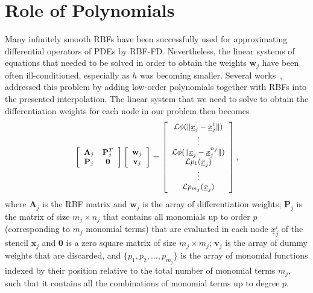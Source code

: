 \documentclass{UUThesisTemplate}
\begin{document}
\section{Role of Polynomials}
Many infinitely smooth RBFs have been successfully used for approximating differential operators of PDEs by RBF-FD. Nevertheless, the linear systems of equations that needed to be solved in order to obtain the weights $\mathbf{w}_j$ have been often ill-conditioned, especially as $h$ was becoming smaller. Several works~\cite{davydov2011adaptive, fornberg2011stabilization, flyer2012guide, larsson2013stable, fornberg2013stable, flyer2016enhancing}, addressed this problem by adding low-order polynomials together with RBFs into the presented interpolation. The linear system that we need to solve to obtain the differentiation weights for each node in our problem then becomes
\begin{equation}
{\footnotesize{
\label{eq:D2}
\left[\begin{array}{cc}
\mathbf{A}_j & \mathbf{P}_j^T \\
\mathbf{P}_j & \mathbf{0} \\
\end{array}\right]
\left[\begin{array}{c}
{\mathbf{w}}_j\\
{\mathbf{v}}_j\\
\end{array}\right]=
\left[\begin{array}{c}
\mathcal{L}\phi(\|\underline{x}_{j}-\underline{x}_j^{1}\|)\\
\vdots \\
\mathcal{L}\phi(\|\underline{x}_{j}-\underline{x}_j^{n_j}\|)\\
\mathcal{L}p_1(\underline{x}_j)\\
\vdots\\
\mathcal{L}p_{m_j}(\underline{x}_j)
\end{array}\right],
}}
\end{equation}
where $\mathbf{A}_j$ is the RBF matrix and $\mathbf{w}_j$ is the array of differentiation weights; $\mathbf{P}_j$ is the matrix of size $m_j \times n_j$ that contains all monomials up to order $p$ (corresponding to $m_j$ monomial terms) that are evaluated in each node $\underline{x}_j^i$ of the stencil $\mathbf{x}_j$ and $\mathbf{0}$ is a zero square matrix of size $m_j \times m_j$; $\mathbf{v}_j$ is the array of dummy weights that are discarded, and $\{p_1, p_2, \ldots, p_{m_j}\}$ is the array of monomial functions indexed by their position relative to the total number of monomial terms $m_j$, such that it contains all the combinations of monomial terms up to degree $p$.
\end{document}
